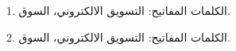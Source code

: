 \documentclass{article}
\begin{document}
\Huge

1. \textarabic{الكلمات المفاتيح: التسويق الالكتروني، السوق.} \\

\begin{Arabic}
2.
 الكلمات المفاتيح: التسويق الالكتروني، السوق.

\end{Arabic}
\end{document}
